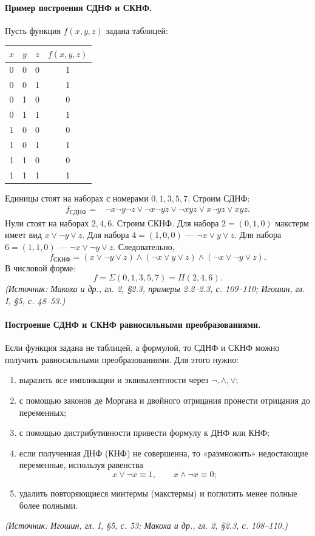 \documentclass[a4paper,12pt]{article}
\begin{document}
\paragraph{Пример построения СДНФ и СКНФ.}
Пусть функция \(f(x,y,z)\) задана таблицей:
\begin{center}
\begin{tabular}{ccc|c}
\toprule
\(x\) & \(y\) & \(z\) & \(f(x,y,z)\)\\
\midrule
0 & 0 & 0 & 1\\
0 & 0 & 1 & 1\\
0 & 1 & 0 & 0\\
0 & 1 & 1 & 1\\
1 & 0 & 0 & 0\\
1 & 0 & 1 & 1\\
1 & 1 & 0 & 0\\
1 & 1 & 1 & 1\\
\bottomrule
\end{tabular}
\end{center}
Единицы стоят на наборах с номерами \(0,1,3,5,7\). Строим СДНФ:
\[
\begin{aligned}
f_{\text{СДНФ}}={}&
\neg x\neg y\neg z
\lor \neg x\neg y z
\lor \neg x y z
\lor x\neg y z
\lor x y z.
\end{aligned}
\]
Нули стоят на наборах \(2,4,6\). Строим СКНФ. Для набора \(2=(0,1,0)\) макстерм имеет вид \(x\lor\neg y\lor z\). Для набора \(4=(1,0,0)\) — \(\neg x\lor y\lor z\). Для набора \(6=(1,1,0)\) — \(\neg x\lor\neg y\lor z\). Следовательно,
\[
f_{\text{СКНФ}}=
(x\lor\neg y\lor z)
\land
(\neg x\lor y\lor z)
\land
(\neg x\lor\neg y\lor z).
\]
В числовой форме:
\[
f=\Sigma(0,1,3,5,7)=\Pi(2,4,6).
\]
\textit{(Источник: Макоха и др., гл. 2, §2.3, примеры 2.2--2.3, с. 109--110; Игошин, гл. I, §5, с. 48--53.)}

\paragraph{Построение СДНФ и СКНФ равносильными преобразованиями.}
Если функция задана не таблицей, а формулой, то СДНФ и СКНФ можно получить равносильными преобразованиями. Для этого нужно:
\begin{enumerate}[label=\arabic*)]
\item выразить все импликации и эквивалентности через \(\neg,\land,\lor\);
\item с помощью законов де Моргана и двойного отрицания пронести отрицания до переменных;
\item с помощью дистрибутивности привести формулу к ДНФ или КНФ;
\item если полученная ДНФ (КНФ) не совершенна, то «размножить» недостающие переменные, используя равенства
\[
x\lor\neg x\equiv 1,\qquad
x\land\neg x\equiv 0;
\]
\item удалить повторяющиеся минтермы (макстермы) и поглотить менее полные более полными.
\end{enumerate}
\textit{(Источник: Игошин, гл. I, §5, с. 53; Макоха и др., гл. 2, §2.3, с. 108--110.)}
\end{document}

